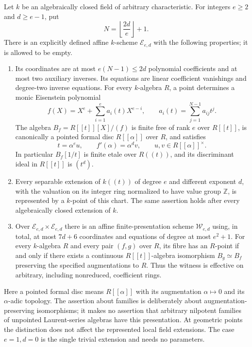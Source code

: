 \begin{proposition}
\label{D:local-Eisenstein-linear-atlas}
Let $k$ be an algebraically closed field of arbitrary characteristic.
For integers $e\ge2$ and $d\ge e-1$, put
\[
                  N=\left\lfloor\frac{2d}{e}\right\rfloor+1.
                                                               \tag{D.EA.1}
\]
There is an explicitly defined affine $k$-scheme $\mathcal E_{e,d}$
with the following properties; it is allowed to be empty.
\begin{enumerate}
\item Its coordinates are at most $e(N-1)\le2d$ polynomial
coefficients and at most two auxiliary inverses. Its equations are
linear coefficient vanishings and degree-two inverse equations.
For every $k$-algebra $R$, a point determines a monic Eisenstein polynomial
\[
 f(X)=X^e+\sum_{i=1}^{e}a_i(t)X^{e-i},\qquad
 a_i(t)=\sum_{j=1}^{N-1}a_{ij}t^j.                       \tag{D.EA.2}
\]
The algebra $B_f=R[[t]][X]/(f)$ is finite free of rank $e$ over
$R[[t]]$, is canonically a pointed formal disc $R[[\alpha]]$ over $R$,
and satisfies
\[
 t=\alpha^e u,\qquad f'(\alpha)=\alpha^d v,
 \qquad u,v\in R[[\alpha]]^\times.                       \tag{D.EA.3}
\]
In particular $B_f[1/t]$ is finite etale over $R((t))$, and its
discriminant ideal in $R[[t]]$ is $(t^d)$.
\item Every separable extension of $k((t))$ of degree $e$ and
different exponent $d$, with the valuation on its integer ring
normalized to have value group $\mathbb Z$, is represented by a
$k$-point of this chart. The same assertion holds after every
algebraically closed extension of $k$.
\item Over $\mathcal E_{e,d}\times\mathcal E_{e,d}$ there is an affine
finite-presentation scheme $\mathcal W_{e,d}$ using, in total,
at most $7d+6$ coordinates and equations of degree at most $e^2+1$.
For every $k$-algebra $R$ and every pair $(f,g)$ over $R$, its fibre
has an $R$-point if and only if there exists a continuous
$R[[t]]$-algebra isomorphism $B_g\simeq B_f$ preserving the
specified augmentations to $R$. Thus the witness is effective on
arbitrary, including nonreduced, coefficient rings.
\end{enumerate}
Here a pointed formal disc means $R[[\alpha]]$ with its augmentation
$\alpha\mapsto0$ and its $\alpha$-adic topology. The assertion about
families is deliberately about augmentation-preserving isomorphisms;
it makes no assertion that arbitrary nilpotent families of unpointed
Laurent-series algebras have this presentation. At geometric points
the distinction does not affect the represented local field extensions.
The case $e=1,d=0$ is the single trivial extension and needs no parameters.
\end{proposition}

